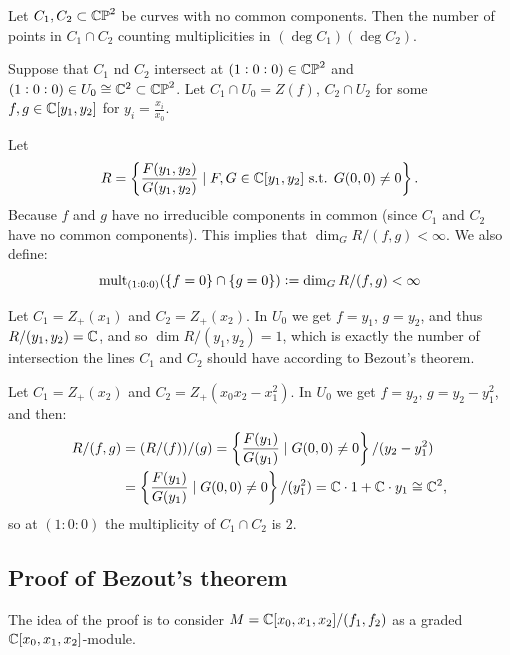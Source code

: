 \documentclass[11pt,a4paper]{article}
\begin{document}
\begin{theorem}
  Let $C_1,C_2 \subset \mathbb{CP}^2$ be curves with no common components.
  Then the number of points in $C_1 \cap C_2$ counting multiplicities in
  $(\deg  C_1)(\deg  C_2)$.
\end{theorem}


\begin{remark}
  Suppose that $C_1$ nd $C_2$ intersect at $(1:0:0) \in \mathbb{CP}^2$
  and $(1:0:0) \in U_0 \cong \mathbb{C}^2 \subset \mathbb{CP}^2$.
  Let $C_1 \cap U_0 = Z(f)$, $C_2 \cap U_2$ for some $f,g \in \mathbb{C}[y_1,y_2]$
  for $y_i = \frac{x_i}{x_0}$.

  Let
  \[
    R = \left\{\frac{F(y_1,y_2)}{G(y_1,y_2)} \mid F,G \in \mathbb{C}[y_1,y_2] \text{ s.t. } G(0,0) \neq 0\right\}.
  \]
  Because $f$ and $g$ have no irreducible components in common
  (since $C_1$ and $C_2$ have no common components).
  This implies that $\dim_G R/(f,g) < \infty$.
  We also define:
  \[
    \mathrm{mult}_{(1:0:0)} (\left\{f=0\right\} \cap \left\{g=0\right\}) :=
    \dim_G R/(f,g) < \infty
  \]
\end{remark}

\begin{example}
  Let $C_1 = Z_+(x_1)$ and $C_2 = Z_+(x_2)$.
  In $U_0$ we get $f = y_1$, $g = y_2$,
  and thus $R / (y_1,y_2) = \mathbb{C}$, %
  and so $\dim R/(y_1,y_2) = 1$,
  which is exactly the number of intersection the lines $C_1$ and $C_2$
  should have according to Bezout's theorem.
\end{example}

\begin{example}
  Let $C_1 = Z_+(x_2)$ and $C_2 = Z_+(x_0 x_2 - x_1^2)$.
  In $U_0$ we get $f = y_2$, $g = y_2 - y_1^2$,
  and then:
  \begin{align*}
    R / (f,g) &=
    (R / (f)) / (g) =
    \left\{\frac{F(y_1)}{G(y_1)} \mid G(0,0) \neq 0\right\} / (y_2 - y_1^2) \\ &=
    \left\{\frac{F(y_1)}{G(y_1)} \mid G(0,0) \neq 0\right\} / (y_1^2) =
    \mathbb{C} \cdot 1 + \mathbb{C} \cdot y_1 \cong \mathbb{C}^2,
  \end{align*}
  so at $(1:0:0)$ the multiplicity of $C_1 \cap C_2$ is $2$.
\end{example}

\subsection{Proof of Bezout's theorem}
The idea of the proof is to consider $M = \mathbb{C}[x_0,x_1,x_2] / (f_1,f_2)$
as a graded $\mathbb{C}[x_0,x_1,x_2]$-module.
\end{document}
